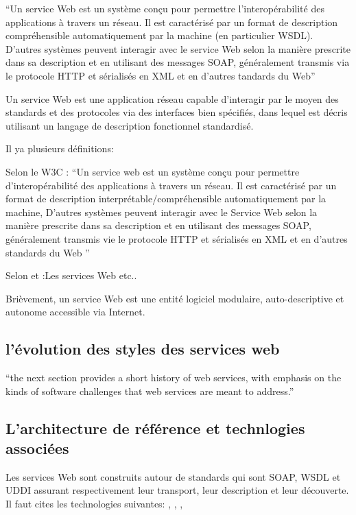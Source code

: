 	``Un service Web est un système conçu pour permettre l'interopérabilité des applications à travers un réseau.
	Il est caractérisé par un format de description compréhensible automatiquement par la machine (en particulier WSDL).
       	D’autres systèmes peuvent interagir avec le service Web selon la manière prescrite dans sa description
	et en utilisant des messages SOAP, généralement transmis via le protocole HTTP et sérialisés en XML et en d’autres 
	tandards du Web''

	Un service Web est une application réseau capable d'interagir par le moyen des standards et des protocoles 
	via des interfaces bien spécifiés, dans lequel est décris utilisant un langage de description fonctionnel
	standardisé\cite{curbera2001web}.

	Il ya plusieurs définitions:

	Selon le W3C \cite{w3c_ws_arch:2014:Misc}:  ``Un service web est un système conçu pour permettre d'interopérabilité
	des applications à travers un réseau. Il est caractérisé par un format de description 
	interprétable/compréhensible automatiquement par la machine, D'autres systèmes peuvent interagir avec le
	Service Web selon la manière prescrite dans sa description et en utilisant des messages SOAP, généralement
	transmis vie le protocole HTTP et sérialisés en XML et en d'autres standards du Web ''

        Selon \cite{papazoglou2003service} et \cite{papazoglou2007service} :Les services Web etc..

	Brièvement, un service Web est une entité logiciel modulaire, auto-descriptive et autonome accessible 
	via Internet.

    
    \subsection{l'évolution des styles des services web}
	``the next section provides a short history of web services, with emphasis on the kinds of software challenges
	that web services are meant to address.''

    \subsection{L'architecture de référence et technlogies associées}
	Les services Web sont construits autour de standards qui sont SOAP, WSDL et UDDI assurant respectivement leur
	transport, leur description et leur découverte.\\
	Il faut cites les technologies suivantes: \cite{w3c_ws_arch:2014:Misc}, \cite{soap_1.2_primer:2014:Misc}
	\cite{wsdl1.1:2014:Misc}, \cite{wsdl20:2014:Misc}, \cite{bray1998extensible} \\

